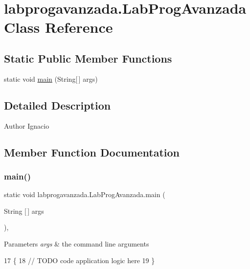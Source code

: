 \hypertarget{classlabprogavanzada_1_1_lab_prog_avanzada}{}\section{labprogavanzada.\+Lab\+Prog\+Avanzada Class Reference}
\label{classlabprogavanzada_1_1_lab_prog_avanzada}
\subsection*{Static Public Member Functions}
\begin{DoxyCompactItemize}
\item 
static void \mbox{\hyperlink{classlabprogavanzada_1_1_lab_prog_avanzada_a09ad7ba6e740ea55f616cf54a97463aa}{main}} (String\mbox{[}$\,$\mbox{]} args)
\end{DoxyCompactItemize}


\subsection{Detailed Description}
\begin{DoxyAuthor}{Author}
Ignacio 
\end{DoxyAuthor}


\subsection{Member Function Documentation}
\mbox{\label{classlabprogavanzada_1_1_lab_prog_avanzada_a09ad7ba6e740ea55f616cf54a97463aa}} 
\subsubsection{\texorpdfstring{main()}{main()}}
{\footnotesize\ttfamily static void labprogavanzada.\+Lab\+Prog\+Avanzada.\+main (\begin{DoxyParamCaption}\item[{String \mbox{[}$\,$\mbox{]}}]{args }\end{DoxyParamCaption})\hspace{0.3cm}{\ttfamily [inline]}, {\ttfamily [static]}}


\begin{DoxyParams}{Parameters}
{\em args} & the command line arguments \\
\hline
\end{DoxyParams}

\begin{DoxyCode}
17                                            \{
18         \textcolor{comment}{// TODO code application logic here}
19     \}
\end{DoxyCode}
